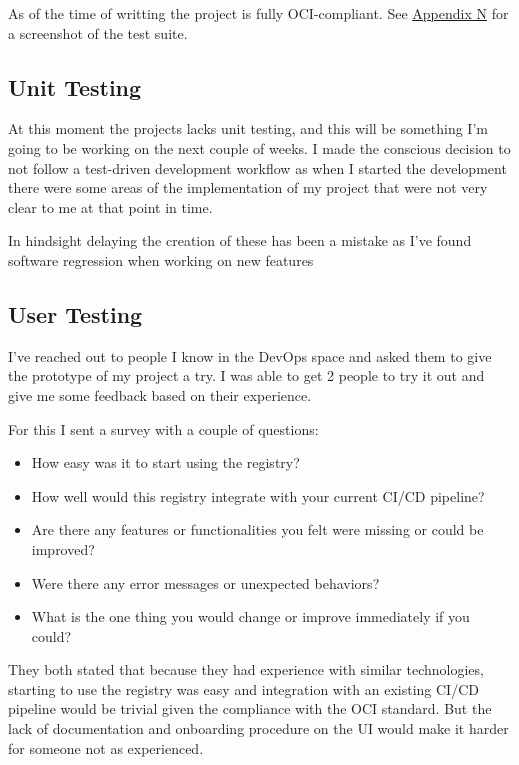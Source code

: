 \documentclass{article}
\begin{document}
  As of the time of writting the project is fully OCI-compliant. See \hyperref[sec:appendix-n]{Appendix N} for a screenshot of the test suite.

  \subsection{Unit Testing}

  At this moment the projects lacks unit testing, and this will be something I'm going to be working on the next couple of weeks. I made the conscious decision to not follow a test-driven development workflow as when I started the development there were some areas of the implementation of my project that were not very clear to me at that point in time.

  In hindsight delaying the creation of these has been a mistake as I've found software regression when working on new features

  \subsection{User Testing}

  I've reached out to people I know in the DevOps space and asked them to give the prototype of my project a try. I was able to get 2 people to try it out and give me some feedback based on their experience.

  For this I sent a survey with a couple of questions:

  \begin{itemize}
    \item How easy was it to start using the registry?
    \item How well would this registry integrate with your current CI/CD pipeline?
    \item Are there any features or functionalities you felt were missing or could be improved?
    \item Were there any error messages or unexpected behaviors?
    \item What is the one thing you would change or improve immediately if you could?
  \end{itemize}

  They both stated that because they had experience with similar technologies, starting to use the registry was easy and integration with an existing CI/CD pipeline would be trivial given the compliance with the OCI standard. But the lack of documentation and onboarding procedure on the UI would make it harder for someone not as experienced.
\end{document}
